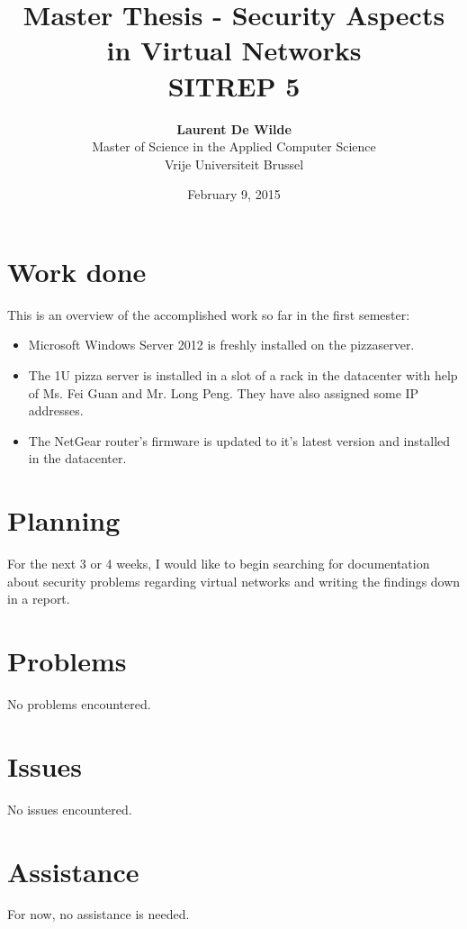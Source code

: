 \documentclass[11pt, a4paper]{article}
\title{Master Thesis -  Security Aspects in Virtual Networks\\ \textbf{SITREP 5}}
\author{\textbf{Laurent De Wilde} \\ Master of Science in the Applied Computer Science \\ Vrije Universiteit Brussel}
\date{February 9, 2015}
\begin{document}
\maketitle

\section{Work done}

This is an overview of the accomplished work so far in the first semester:
\begin{itemize}
\item Microsoft Windows Server 2012 is freshly installed on the pizzaserver.
\item The 1U pizza server is installed in a slot of a rack in the datacenter with help of Ms. Fei Guan and Mr. Long Peng. They have also assigned some IP addresses.
\item The NetGear router's firmware is updated to it's latest version and installed in the datacenter.
\end{itemize}

\section{Planning}

For the next 3 or 4 weeks, I would like to begin searching for documentation about security problems regarding virtual networks and writing the findings down in a report.

\section{Problems}

No problems encountered.

\section{Issues}

No issues encountered.

\section{Assistance}

For now, no assistance is needed.
\end{document}
